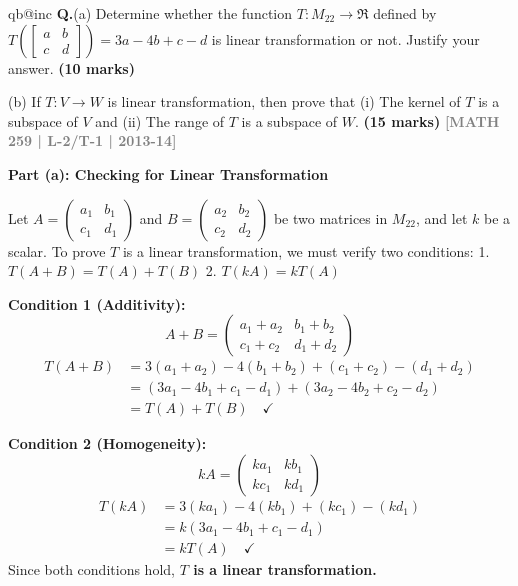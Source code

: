 \documentclass[12pt,a3paper]{article}
\makeatletter
\newcommand{\yr}[1]{\hfill\textcolor{gray}{\small\textbf{[#1]}}}
\newcommand{\mk}[1]{\textcolor{orange!70!black}{\small\textbf{(#1 marks)}}}
\newcounter{qnum}
\newcommand{\Q}[1]{%
  \csname qb@inc\endcsname
  \needspace{4\baselineskip}
  \refstepcounter{qnum}
  \vspace{6pt}
  \noindent\textbf{Q\theqnum.}\enspace #1\par
}
\makeatother
\begin{document}
\Q{(a) Determine whether the function 
$T : M_{22} \rightarrow \Re$ defined by $T\left(\begin{bmatrix} a & b \\ c & d \end{bmatrix}\right) = 3a - 4b + c - d$
is linear transformation or not. Justify your answer. \mk{10}

(b) If $T : V \rightarrow W$ is linear transformation, then prove that 
(i) The kernel of $T$ is a subspace of $V$ and (ii) The range of $T$ is a subspace of $W$. \mk{15}
\yr{MATH 259 | L-2/T-1 | 2013-14}
}

\begin{tcolorbox}[enhanced,breakable,colback=cF!4,colframe=cF,
  boxrule=0.8pt,arc=5pt,
  title={\textbf{Answer}},
  fonttitle=\bfseries\color{white},colbacktitle=cF]

\textbf{Part (a): Checking for Linear Transformation}

Let $A = \begin{pmatrix} a_1 & b_1 \\ c_1 & d_1 \end{pmatrix}$ and $B = \begin{pmatrix} a_2 & b_2 \\ c_2 & d_2 \end{pmatrix}$ be two matrices in $M_{22}$, and let $k$ be a scalar. 
To prove $T$ is a linear transformation, we must verify two conditions:
1. $T(A + B) = T(A) + T(B)$
2. $T(kA) = k T(A)$

\textbf{Condition 1 (Additivity):}
\[
A + B = \begin{pmatrix} a_1+a_2 & b_1+b_2 \\ c_1+c_2 & d_1+d_2 \end{pmatrix}
\]
\[
\begin{aligned}
T(A + B) &= 3(a_1+a_2) - 4(b_1+b_2) + (c_1+c_2) - (d_1+d_2) \\
         &= (3a_1 - 4b_1 + c_1 - d_1) + (3a_2 - 4b_2 + c_2 - d_2) \\
         &= T(A) + T(B) \quad \checkmark
\end{aligned}
\]

\textbf{Condition 2 (Homogeneity):}
\[
kA = \begin{pmatrix} ka_1 & kb_1 \\ kc_1 & kd_1 \end{pmatrix}
\]
\[
\begin{aligned}
T(kA) &= 3(ka_1) - 4(kb_1) + (kc_1) - (kd_1) \\
      &= k(3a_1 - 4b_1 + c_1 - d_1) \\
      &= k T(A) \quad \checkmark
\end{aligned}
\]
Since both conditions hold, \textbf{$T$ is a linear transformation.}


\end{tcolorbox}
\end{document}
